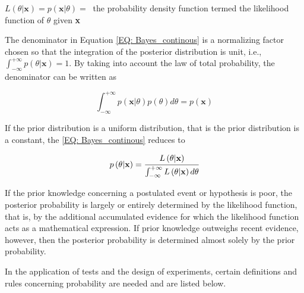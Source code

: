 \documentclass[a4paper,fleqn]{cas-dc}
\begin{document}
$L\left( \theta|\textbf{x} \right) = p\left( \textbf{x}|\theta \right) = ~$ the probability density function termed the likelihood function of $\theta$ given \textbf{x}

The denominator in Equation \ref{EQ: Bayes_continous} is a normalizing factor chosen so that the integration of the posterior distribution is unit, i.e., $\int_{-\infty}^{+\infty} p\left( \theta|\textbf{x} \right) = 1$. By taking into account the law of total probability, the denominator can be written as

{\footnotesize
\begin{equation}
	\int_{-\infty}^{+\infty} p\left( \textbf{x}|\theta \right) p(\theta) d\theta = p(\textbf{x})
\end{equation} }

If the prior distribution is a uniform distribution, that is the prior distribution is a constant, the \ref{EQ: Bayes_continous} reduces to 

{\footnotesize
\begin{equation}
	p\left( \theta|\textbf{x} \right) = \cfrac{L\left( \theta|\textbf{x} \right)}{\int_{-\infty}^{+\infty} L\left( \theta|\textbf{x}\right) d\theta}
\end{equation} }

If the prior knowledge concerning a postulated event or hypothesis is poor, the posterior probability is largely or entirely determined by the likelihood function, that is, by the additional accumulated evidence for which the likelihood function acts as a mathematical expression. If prior knowledge outweighs recent evidence, however, then the posterior probability is determined almost solely by the prior probability.

In the application of tests and the design of experiments, certain definitions and rules concerning probability are needed and are listed below.
\end{document}
